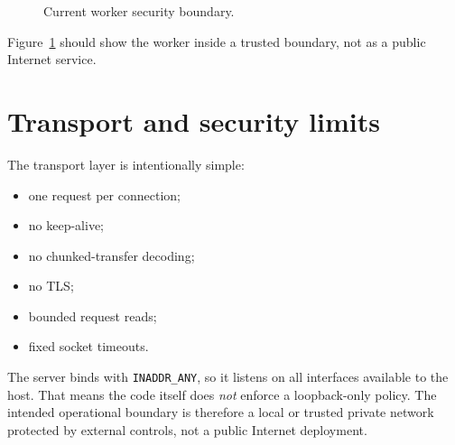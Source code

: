 \begin{figure}[htbp]
\centering
\caption{Current worker security boundary.}
\label{fig:worker-security-boundary}
\end{figure}

Figure~\ref{fig:worker-security-boundary} should show the worker inside a
trusted boundary, not as a public Internet service.

\section{Transport and security limits}
\label{sec:worker-transport-security}

The transport layer is intentionally simple:
\begin{itemize}
\item one request per connection;
\item no keep-alive;
\item no chunked-transfer decoding;
\item no TLS;
\item bounded request reads;
\item fixed socket timeouts.
\end{itemize}

The server binds with \texttt{INADDR\_ANY}, so it listens on all interfaces
available to the host. That means the code itself does \emph{not} enforce a
loopback-only policy. The intended operational boundary is therefore a local or
trusted private network protected by external controls, not a public Internet
deployment.


